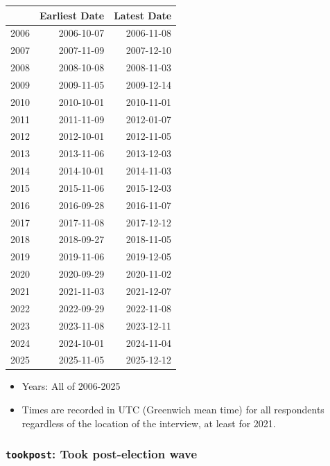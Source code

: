 \documentclass[10pt,article,oneside]{memoir}
\begin{document}
\begin{table}
\centering
\begin{tabular}{lrr}
\toprule
 & Earliest Date & Latest Date\\
\midrule
2006 & 2006-10-07 & 2006-11-08\\
2007 & 2007-11-09 & 2007-12-10\\
2008 & 2008-10-08 & 2008-11-03\\
2009 & 2009-11-05 & 2009-12-14\\
2010 & 2010-10-01 & 2010-11-01\\
2011 & 2011-11-09 & 2012-01-07\\
2012 & 2012-10-01 & 2012-11-05\\
2013 & 2013-11-06 & 2013-12-03\\
2014 & 2014-10-01 & 2014-11-03\\
2015 & 2015-11-06 & 2015-12-03\\
2016 & 2016-09-28 & 2016-11-07\\
2017 & 2017-11-08 & 2017-12-12\\
2018 & 2018-09-27 & 2018-11-05\\
2019 & 2019-11-06 & 2019-12-05\\
2020 & 2020-09-29 & 2020-11-02\\
2021 & 2021-11-03 & 2021-12-07\\
2022 & 2022-09-29 & 2022-11-08\\
2023 & 2023-11-08 & 2023-12-11\\
2024 & 2024-10-01 & 2024-11-04\\
2025 & 2025-11-05 & 2025-12-12\\
\bottomrule
\end{tabular}
\end{table}

\begin{itemize}
\tightlist
\item
  Years: All of 2006-2025
\item
  Times are recorded in UTC (Greenwich mean time) for all respondents
  regardless of the location of the interview, at least for 2021.
\end{itemize}

\subsubsection{\texorpdfstring{\texttt{tookpost}: Took post-election
wave}{tookpost: Took post-election wave}}\label{tookpost-took-post-election-wave}
\end{document}
